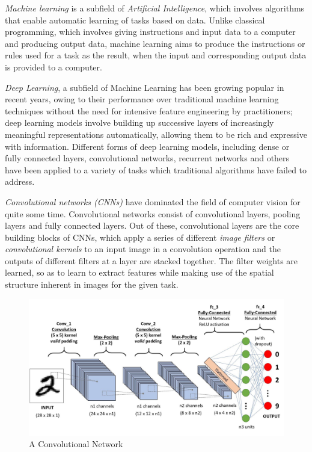 
\par \textit{Machine learning} is a subfield of \textit{Artificial Intelligence}, which involves algorithms that enable automatic learning of tasks based on data. Unlike classical programming, which involves giving instructions and input data to a computer and producing output data, machine learning aims to produce the instructions or rules used for a task as the result, when the input and corresponding output data is provided to a computer.

\par \textit{Deep Learning}, a subfield of Machine Learning has been growing popular in recent years, owing to their performance over traditional machine learning techniques without the need for intensive feature engineering by practitioners; deep learning models involve building up successive layers of increasingly meaningful representations automatically, allowing them to be rich and expressive with information. Different forms of deep learning models, including dense or fully connected layers, convolutional networks, recurrent networks and others have been applied to a variety of tasks which traditional algorithms have failed to address.

\par \textit{Convolutional networks (CNNs)} have dominated the field of computer vision for quite some time. Convolutional networks consist of convolutional layers, pooling layers and fully connected layers. Out of these, convolutional layers are the core building blocks of CNNs, which apply a series of different \textit{image filters} or \textit{convolutional kernels} to an input image in a convolution operation and the outputs of different filters at a layer are stacked together. The filter weights are learned, so as to learn to extract features while making use of the spatial structure inherent in images for the given task.
\begin{figure}[h]
\centering
\includegraphics[width=\linewidth]{assets/img/cnn.jpeg}
\caption{A Convolutional Network}
\label{fig:cnn}
\end{figure}

